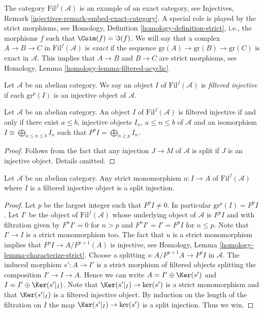 \medskip\noindent
The category $\text{Fil}^f(\mathcal{A})$ is an example of an
exact category, see
Injectives, Remark \ref{injectives-remark-embed-exact-category}.
A special role is played by the strict morphisms, see
Homology, Definition \ref{homology-definition-strict},
i.e., the morphisms $f$ such that $\Coim(f) = \Im(f)$.
We will say that a complex $A \to B \to C$ in $\text{Fil}^f(\mathcal{A})$ is
{\it exact} if the sequence $\text{gr}(A) \to \text{gr}(B) \to \text{gr}(C)$
is exact in $\mathcal{A}$. This implies that $A \to B$ and $B \to C$
are strict morphisms, see
Homology, Lemma \ref{homology-lemma-filtered-acyclic}.

\begin{definition}
\label{definition-filtered-complexes-notation}
Let $\mathcal{A}$ be an abelian category.
We say an object $I$ of $\text{Fil}^f(\mathcal{A})$
is {\it filtered injective} if each $\text{gr}^p(I)$ is
an injective object of $\mathcal{A}$.
\end{definition}

\begin{lemma}
\label{lemma-filtered-injective}
Let $\mathcal{A}$ be an abelian category.
An object $I$ of $\text{Fil}^f(\mathcal{A})$ is filtered injective
if and only if
there exist $a \leq b$, injective objects $I_n$, $a \leq n \leq b$
of $\mathcal{A}$ and an isomorphism $I \cong \bigoplus_{a \leq n \leq b} I_n$
such that $F^pI = \bigoplus_{n \geq p} I_n$.
\end{lemma}

\begin{proof}
Follows from the fact that any injection $J \to M$ of $\mathcal{A}$
is split if $J$ is an injective object. Details omitted.
\end{proof}

\begin{lemma}
\label{lemma-split-strict-monomorphism}
Let $\mathcal{A}$ be an abelian category.
Any strict monomorphism $u : I \to A$ of $\text{Fil}^f(\mathcal{A})$
where $I$ is a filtered injective object is a split injection.
\end{lemma}

\begin{proof}
Let $p$ be the largest integer such that $F^pI \not = 0$.
In particular $\text{gr}^p(I) = F^pI$.
Let $I'$ be the object of $\text{Fil}^f(\mathcal{A})$ whose
underlying object of $\mathcal{A}$ is $F^pI$ and with filtration
given by $F^nI' = 0$ for $n > p$ and $F^nI' = I' = F^pI$ for
$n \leq p$. Note that $I' \to I$ is a strict monomorphism too.
The fact that $u$ is a strict monomorphism implies that
$F^pI \to A/F^{p + 1}(A)$ is injective, see
Homology, Lemma \ref{homology-lemma-characterize-strict}.
Choose a splitting $s : A/F^{p + 1}A \to F^pI$ in $\mathcal{A}$.
The induced morphism $s' : A \to I'$ is a strict morphism of
filtered objects splitting the composition $I' \to I \to A$.
Hence we can write $A = I' \oplus \Ker(s')$ and
$I = I' \oplus \Ker(s'|_I)$. Note that
$\Ker(s'|_I) \to \text{ker}(s')$ is a strict monomorphism
and that $\Ker(s'|_I)$ is a filtered injective object.
By induction on the length of the filtration on $I$ the map
$\Ker(s'|_I) \to \text{ker}(s')$ is a split injection.
Thus we win.
\end{proof}

